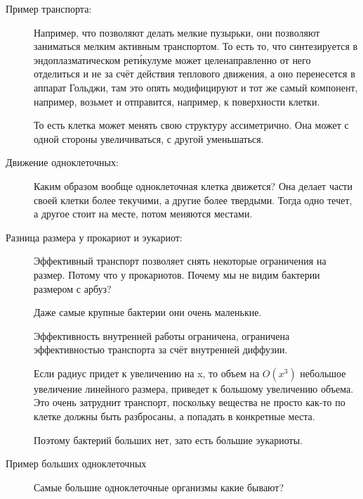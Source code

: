 \begin{description}
\item[Пример транспорта:]

Например, что позволяют делать мелкие пузырьки, они позволяют
заниматься мелким активным транспортом. То есть то, 
что синтезируется в эндоплазматическом рети́кулуме может 
целенаправленно от него отделиться и не 
за счёт действия теплового движения, а оно перенесется 
в аппарат Гольджи, там это опять модифицируют и тот же самый 
компонент, например, возьмет и отправится, например, к поверхности клетки. 

То есть клетка может менять свою структуру ассиметрично. Она может 
с одной стороны увеличиваться, с другой уменьшаться.    

\item[Движение одноклеточных:]

Каким образом вообще одноклеточная клетка движется? 
Она делает части своей клетки более текучими, а
другие более твердыми. Тогда одно течет, а
другое стоит на месте, потом меняются местами. 

\item[Разница размера у прокариот и эукариот:]

Эффективный транспорт позволяет снять некоторые ограничения на размер. 
Потому что у прокариотов. Почему мы не видим бактерии размером с арбуз? 

Даже самые крупные бактерии они очень маленькие. 

Эффективность внутренней работы ограничена, ограничена эффективностью 
транспорта за счёт внутренней диффузии. 

Если радиус придет к увеличению на x, то объем на $O(x^3)$ небольшое 
увеличение линейного размера, 
приведет к большому увеличению объема. Это очень затруднит 
транспорт, поскольку вещества не просто как-то 
по клетке должны быть разбросаны, а попадать 
в конкретные места. 

Поэтому бактерий больших нет, зато есть большие эукариоты.    
                          
\item[Пример больших одноклеточных]
Самые большие одноклеточные организмы какие бывают? 


\end{description}
